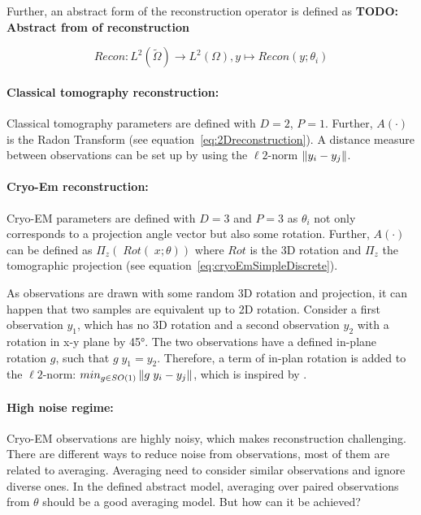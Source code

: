 Further, an abstract form of the reconstruction operator is defined as 
\textbf{TODO: Abstract from of reconstruction}

\begin{equation}
    Recon : L^2(\tilde{\Omega}) \to L^2(\Omega), y \mapsto Recon(y; \theta_i)
\end{equation}



\paragraph{Classical tomography reconstruction:}

Classical tomography parameters are defined with $D=2$, $P=1$.
Further, $A(\cdot)$ is the Radon Transform (see equation~\ref{eq:2Dreconstruction}).
A distance measure between observations can be set up by using the $\ell2$-norm $\left\lVert y_i - y_j\right\rVert$.

\paragraph{Cryo-Em reconstruction:}
Cryo-EM parameters are defined with $D=3$ and $P=3$ as $\theta_i$ not only corresponds to
a projection angle vector but also some rotation.
Further, $A(\cdot)$ can be defined as $\Pi_z \left(\; Rot(\;x; \theta) \right)$ 
where $Rot$ is the 3D rotation and $\Pi_z$ the tomographic projection (see equation~\ref{eq:cryoEmSimpleDiscrete}).

As observations are drawn with some random 3D rotation and projection, 
it can happen that two samples are equivalent up to 2D rotation. 
Consider a first observation $y_1$, which has no 3D rotation and 
a second observation $y_2$ with a rotation in x-y plane by 45°.
The two observations have a defined in-plane rotation $g$, such that $g \; y_1 = y_2$.
Therefore, a term of in-plan rotation is added to the $\ell2$-norm: $min_{g \in SO(1)}\left\lVert g \;y_i - y_j\right\rVert$, 
which is inspired by \cite{multiDiffusionMaps}. 

\paragraph{High noise regime:}
Cryo-EM observations are highly noisy, which makes reconstruction challenging. 
There are different ways to reduce noise from observations, most of them are related to averaging. 
Averaging need to consider similar observations and ignore diverse ones. 
In the defined abstract model, averaging over paired observations from $\theta$ should be a good averaging model.
But how can it be achieved? 

